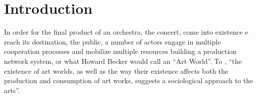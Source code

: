 \documentclass[a4paper, 12pt, openright, oneside, german, french, brazil, english, article]{abntex2}
\begin{document}
	\textual
	\maketitle
	
	\section{Introduction}


	In order for the final product of an orchestra, the concert, come into existence e reach its destination, the public, a number of actors engage in multiple cooperation processes and mobilize multiple resources building a production network system, or what Howard Becker would call an ``Art World''. To , ``the existence of art worlds, as well as the way their existence affects both the production and consumption of art works, suggests a sociological approach to the arts''.
	
\end{document}
